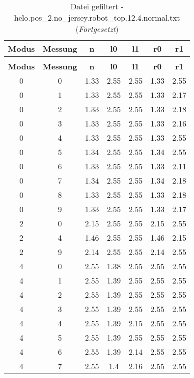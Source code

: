 \begin{longtable}{|c|c||c||c|c||c|c|}
	\caption{Datei gefiltert - helo.pos\_2.no\_jersey.robot\_top.12.4.normal.txt} \label{tab:helo.pos-2.no-jersey.robot-top.12.4.normal.txt} \\ \hline
	\textbf{Modus} & \textbf{Messung} & \textbf{n} & \textbf{l0} & \textbf{l1} & \textbf{r0} & \textbf{r1}\\ \hline
	\endfirsthead
	\caption[]{Datei gefiltert - helo.pos\_2.no\_jersey.robot\_top.12.4.normal.txt (\emph{Fortgesetzt})} \\ \hline
	\textbf{Modus} & \textbf{Messung} & \textbf{n} & \textbf{l0} & \textbf{l1} & \textbf{r0} & \textbf{r1}\\ \hline
	\endhead
	0 & 0 & 1.33 & 2.55 & 2.55 & 1.33 & 2.55 \\ \hline
	0 & 1 & 1.33 & 2.55 & 2.55 & 1.33 & 2.17 \\ \hline
	0 & 2 & 1.33 & 2.55 & 2.55 & 1.33 & 2.18 \\ \hline
	0 & 3 & 1.33 & 2.55 & 2.55 & 1.33 & 2.16 \\ \hline
	0 & 4 & 1.33 & 2.55 & 2.55 & 1.33 & 2.55 \\ \hline
	0 & 5 & 1.34 & 2.55 & 2.55 & 1.34 & 2.55 \\ \hline
	0 & 6 & 1.33 & 2.55 & 2.55 & 1.33 & 2.11 \\ \hline
	0 & 7 & 1.34 & 2.55 & 2.55 & 1.34 & 2.18 \\ \hline
	0 & 8 & 1.33 & 2.55 & 2.55 & 1.33 & 2.18 \\ \hline
	0 & 9 & 1.33 & 2.55 & 2.55 & 1.33 & 2.17 \\ \hline
	2 & 0 & 2.15 & 2.55 & 2.55 & 2.15 & 2.55 \\ \hline
	2 & 4 & 1.46 & 2.55 & 2.55 & 1.46 & 2.15 \\ \hline
	2 & 9 & 2.14 & 2.55 & 2.55 & 2.14 & 2.55 \\ \hline
	4 & 0 & 2.55 & 1.38 & 2.55 & 2.55 & 2.55 \\ \hline
	4 & 1 & 2.55 & 1.39 & 2.55 & 2.55 & 2.55 \\ \hline
	4 & 2 & 2.55 & 1.39 & 2.55 & 2.55 & 2.55 \\ \hline
	4 & 3 & 2.55 & 1.39 & 2.55 & 2.55 & 2.55 \\ \hline
	4 & 4 & 2.55 & 1.39 & 2.15 & 2.55 & 2.55 \\ \hline
	4 & 5 & 2.55 & 1.39 & 2.55 & 2.55 & 2.55 \\ \hline
	4 & 6 & 2.55 & 1.39 & 2.14 & 2.55 & 2.55 \\ \hline
	4 & 7 & 2.55 & 1.4 & 2.16 & 2.55 & 2.55 \\ \hline

\end{longtable}
